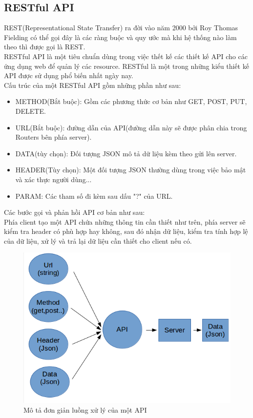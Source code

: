 \subsection{RESTful API}
REST(Representational State Transfer) ra đời vào năm 2000 bởi Roy Thomas Fielding có thể gọi đây là các ràng buộc và quy ước mà khi hệ thống nào làm theo thì được gọi là REST.\\
RESTful API là một tiêu chuẩn dùng trong việc thết kế các thiết kế API cho các ứng dụng web để quản lý các resource. RESTful là một trong những kiểu thiết kế API được sử dụng phổ biến nhất ngày nay.\\
Cấu trúc của một RESTful API gồm những phần như sau:
\begin{itemize}
    \item METHOD(Bắt buộc): Gồm các phương thức cơ bản như GET, POST, PUT, DELETE.
    \item URL(Bắt buộc): đường dẫn của API(đường dẫn này sẽ được phân chia trong Routers bên phía server).
    \item DATA(tùy chọn): Đối tượng JSON mô tả dữ liệu kèm theo gửi lên server.
    \item HEADER(Tùy chọn): Một đối tượng JSON thường dùng trong việc bảo mật và xác thực người dùng...
    \item PARAM: Các tham số đi kèm sau dấu "?" của URL.
\end{itemize}
Các bước gọi và phản hồi API cơ bản như sau:\\
Phía client tạo một API chứa những thông tin cần thiết như trên, phía server sẽ kiểm tra header có phù hợp hay không, sau đó nhận dữ liệu, kiểm tra tính hợp lệ của dữ liệu, xử lý và trả lại dữ liệu cần thiết cho client nếu có.
\begin{figure}[h]
\centering
    \includegraphics[totalheight=7cm]{Images/app_json.png}
    \caption{Mô tả đơn giản luồng xử lý của một API}
    \label{skip_conn}
\end{figure}
